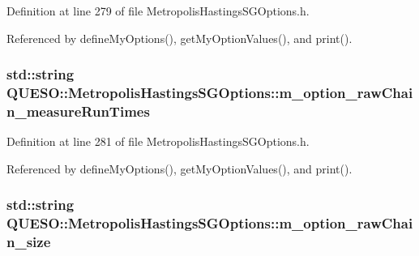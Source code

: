Definition at line 279 of file Metropolis\-Hastings\-S\-G\-Options.\-h.



Referenced by define\-My\-Options(), get\-My\-Option\-Values(), and print().

\hypertarget{class_q_u_e_s_o_1_1_metropolis_hastings_s_g_options_aa0700b39e52408944717b283e0e87607}{
\subsubsection[{m\-\_\-option\-\_\-raw\-Chain\-\_\-measure\-Run\-Times}]{\setlength{\rightskip}{0pt plus 5cm}std\-::string Q\-U\-E\-S\-O\-::\-Metropolis\-Hastings\-S\-G\-Options\-::m\-\_\-option\-\_\-raw\-Chain\-\_\-measure\-Run\-Times\hspace{0.3cm}{\ttfamily [private]}}}\label{class_q_u_e_s_o_1_1_metropolis_hastings_s_g_options_aa0700b39e52408944717b283e0e87607}


Definition at line 281 of file Metropolis\-Hastings\-S\-G\-Options.\-h.



Referenced by define\-My\-Options(), get\-My\-Option\-Values(), and print().

\hypertarget{class_q_u_e_s_o_1_1_metropolis_hastings_s_g_options_af9f6ac21012af90a790e855ad78485e2}{
\subsubsection[{m\-\_\-option\-\_\-raw\-Chain\-\_\-size}]{\setlength{\rightskip}{0pt plus 5cm}std\-::string Q\-U\-E\-S\-O\-::\-Metropolis\-Hastings\-S\-G\-Options\-::m\-\_\-option\-\_\-raw\-Chain\-\_\-size\hspace{0.3cm}{\ttfamily [private]}}}\label{class_q_u_e_s_o_1_1_metropolis_hastings_s_g_options_af9f6ac21012af90a790e855ad78485e2}


